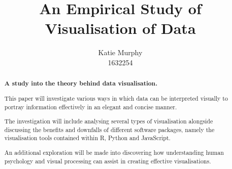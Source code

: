 \documentclass[12pt]{article}
\title{\textbf{An Empirical Study of Visualisation of Data}}
\author{Katie Murphy \\ 1632254}
\begin{document}
\maketitle

\begin{abstract}

    \begin{center}
        \noindent \textbf{A study into the theory behind data visualisation.} 
        
         \vspace{0.3cm}
        
        \noindent This paper will investigate various ways in which data can be interpreted visually to portray information effectively in an elegant and concise manner. 
        
        \vspace{0.3cm}
        
        \noindent The investigation will include analysing several types of visualisation alongside discussing the benefits and downfalls of different software packages, namely the visualisation tools contained within R, Python and JavaScript.
        
        \vspace{0.3cm}
        
        An additional exploration will be made into discovering how understanding human psychology and visual processing can assist in creating effective visualisations.
        
    
    \end{center}    
     
    \end{abstract}
\end{document}
